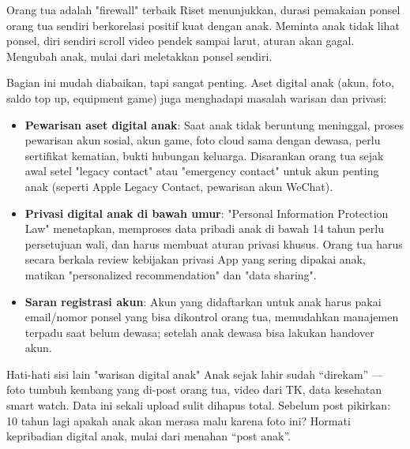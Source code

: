 \begin{tcbinfo}{Orang tua adalah "firewall" terbaik}
Riset menunjukkan, durasi pemakaian ponsel orang tua sendiri berkorelasi positif kuat dengan anak. Meminta anak tidak lihat ponsel, diri sendiri scroll video pendek sampai larut, aturan akan gagal. Mengubah anak, mulai dari meletakkan ponsel sendiri.

\end{tcbinfo}


Bagian ini mudah diabaikan, tapi sangat penting. Aset digital anak (akun, foto, saldo top up, equipment game) juga menghadapi masalah warisan dan privasi:

\begin{itemize}
  \item \textbf{Pewarisan aset digital anak}: Saat anak tidak beruntung meninggal, proses pewarisan akun sosial, akun game, foto cloud sama dengan dewasa, perlu sertifikat kematian, bukti hubungan keluarga. Disarankan orang tua sejak awal setel "legacy contact" atau "emergency contact" untuk akun penting anak (seperti Apple Legacy Contact, pewarisan akun WeChat).
  \item \textbf{Privasi digital anak di bawah umur}: "Personal Information Protection Law" menetapkan, memproses data pribadi anak di bawah 14 tahun perlu persetujuan wali, dan harus membuat aturan privasi khusus. Orang tua harus secara berkala review kebijakan privasi App yang sering dipakai anak, matikan "personalized recommendation" dan "data sharing".
  \item \textbf{Saran registrasi akun}: Akun yang didaftarkan untuk anak harus pakai email/nomor ponsel yang bisa dikontrol orang tua, memudahkan manajemen terpadu saat belum dewasa; setelah anak dewasa bisa lakukan handover akun.
\end{itemize}

\begin{tcbwarn}{Hati-hati sisi lain "warisan digital anak"}
Anak sejak lahir sudah “direkam” — foto tumbuh kembang yang di-post orang tua, video dari TK, data kesehatan smart watch. Data ini sekali upload sulit dihapus total. Sebelum post pikirkan: 10 tahun lagi apakah anak akan merasa malu karena foto ini? Hormati kepribadian digital anak, mulai dari menahan “post anak”.

\end{tcbwarn}

